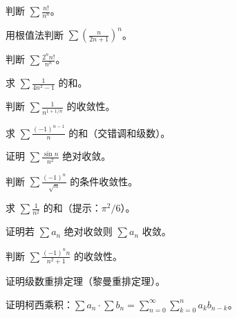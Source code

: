 \begin{exercise}[4] 判断 \(\sum \frac{n!}{n^n}\)。\end{exercise}
\begin{exercise}[4] 用根值法判断 \(\sum (\frac{n}{2n+1})^n\)。\end{exercise}
\begin{exercise}[4] 判断 \(\sum \frac{2^n n!}{n^n}\)。\end{exercise}
\begin{exercise}[4] 求 \(\sum \frac1{4n^2-1}\) 的和。\end{exercise}
\begin{exercise}[4] 判断 \(\sum \frac{1}{n^{1+1/n}}\) 的收敛性。\end{exercise}
\begin{exercise}[5] 求 \(\sum \frac{(-1)^{n-1}}{n}\) 的和（交错调和级数）。\end{exercise}
\begin{exercise}[5] 证明 \(\sum \frac{\sin n}{n^2}\) 绝对收敛。\end{exercise}
\begin{exercise}[5] 判断 \(\sum \frac{(-1)^n}{\sqrt{n}}\) 的条件收敛性。\end{exercise}
\begin{exercise}[5] 求 \(\sum \frac1{n^2}\) 的和（提示：\(\pi^2/6\)）。\end{exercise}
\begin{exercise}[6] 证明若 \(\sum a_n\) 绝对收敛则 \(\sum a_n\) 收敛。\end{exercise}
\begin{exercise}[6] 判断 \(\sum \frac{(-1)^n n}{n^2+1}\) 的收敛性。\end{exercise}
\begin{exercise}[6] 证明级数重排定理（黎曼重排定理）。\end{exercise}
\begin{exercise}[7] 证明柯西乘积：\(\sum a_n \cdot \sum b_n = \sum_{n=0}^\infty\sum_{k=0}^n a_k b_{n-k}\)。\end{exercise}
